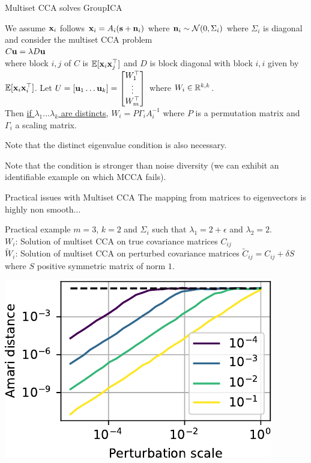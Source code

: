 \documentclass[bigger]{beamer}
\begin{document}
\begin{frame}{Multiset CCA solves GroupICA}
  \begin{theorem}
    We assume $\mathbf{x}_i$ follows $\mathbf{x}_i = A_i (\mathbf{s} + \mathbf{n}_i)$ where  $\mathbf{n}_i \sim \mathcal{N}(0, \Sigma_i)$ where $\Sigma_i$ is diagonal and consider the multiset CCA
    problem \\
      $C \mathbf{u} = \lambda D \mathbf{u}$ \\
      where block $i, j$ of $C$ is $\mathbb{E}[\mathbf{x}_i \mathbf{x}_j^{\top}]$ and $D$ is block
      diagonal with block $i, i$ given by $\mathbb{E}[\mathbf{x}_i \mathbf{x}_i^{\top}]$.
      Let $U = [\mathbf{u}_1 \dots \mathbf{u}_k] = \begin{bmatrix} W_1^{\top} \\ \vdots \\
        W_m^{\top} \end{bmatrix}$ where $W_i \in \mathbb{R}^{k, k}$.  \\
      Then \underline{if $\lambda_1 \dots \lambda_k$ are distincts}, $W_i = P \Gamma_i A_i^{-1}$ where $P$ is a permutation matrix and
      $\Gamma_i$ a scaling matrix.  
  \end{theorem}
  Note that the distinct eigenvalue condition is also necessary.

  Note that the condition is stronger than noise diversity (we can exhibit an identifiable
  example on which MCCA fails).
\end{frame}

\begin{frame}{Practical issues with Multiset CCA}
    The mapping from matrices to eigenvectors is
    highly non smooth...
  \begin{block}{Practical example}
    $m=3$, $k=2$ and $\Sigma_i$ such that $\lambda_1 = 2 + \epsilon$ and $\lambda_2
    = 2$. \\
    $W_i$: Solution of multiset CCA on true covariance matrices $C_{ij}$ \\
    $\tilde{W}_i$: Solution of multiset CCA on perturbed covariance matrices 
    $\tilde{C}_{ij} = C_{ij} + \delta S$ where $S$ positive
    symmetric matrix of norm $1$.
  \end{block}
  \includegraphics[scale=0.8]{figures/multicca_gap.pdf}
\end{frame}
\end{document}
